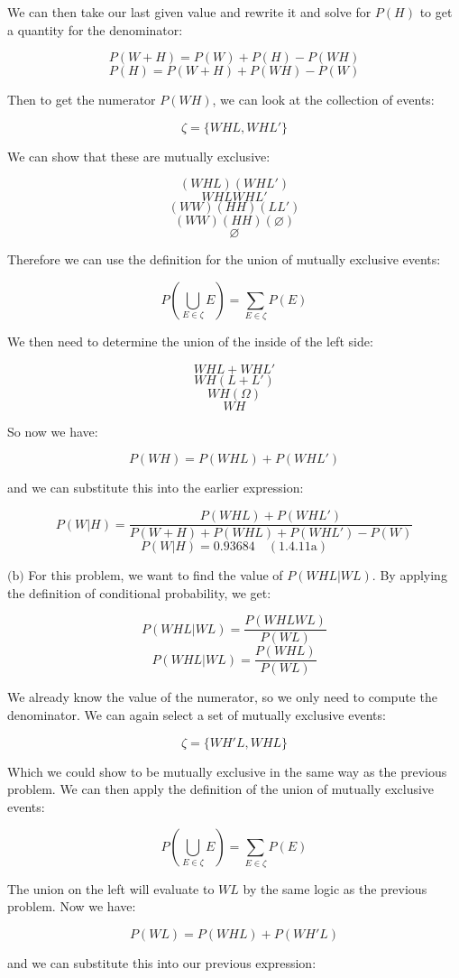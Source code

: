 \documentclass{article}
\newcommand{\subproblem}[3]{$\boxed{\text{(#3)}}$}
\newcommand{\subsolution}[4]{\boxed{#4\quad(\text{#1.#2#3})}}
\begin{document}
We can then take our last given value and rewrite it and solve for
$P(H)$ to get a quantity for the denominator:

\[
P(W+H)=P(W)+P(H)-P(WH)
\] \[
P(H)=P(W+H)+P(WH)-P(W)
\]

Then to get the numerator $P(WH)$, we can look at the collection of
events:

\[
\zeta=\{WHL, WHL'\}
\]

We can show that these are mutually exclusive:

\[
(WHL)(WHL')
\] \[
WHLWHL'
\] \[
(WW)(HH)(LL')
\] \[
(WW)(HH)(\varnothing)
\] \[
\varnothing
\]

Therefore we can use the definition for the union of mutually
exclusive events:

\[
P\left(\bigcup\limits_{E\in\zeta}E\right)=\sum\limits_{E\in\zeta}P(E)
\]

We then need to determine the union of the inside of the left side:

\[
WHL+WHL'
\] \[
WH(L+L')
\] \[
WH(\Omega)
\] \[
WH
\]

So now we have:

\[
P(WH)=P(WHL)+P(WHL')
\]

and we can substitute this into the earlier expression:

\[
P(W|H)=\dfrac{P(WHL)+P(WHL')}{P(W+H)+P(WHL)+P(WHL')-P(W)}
\] \[
\subsolution{1.4}{11}{a}{P(W|H)=0.93684}
\]

%
\subproblem{1.4}{11}{b} For this problem, we want to find the value of
$P(WHL|WL)$. By applying the definition of conditional probability, we
get:

\[
P(WHL|WL)=\dfrac{P(WHLWL)}{P(WL)}
\] \[
P(WHL|WL)=\dfrac{P(WHL)}{P(WL)}
\]

We already know the value of the numerator, so we only need to compute
the denominator. We can again select a set of mutually exclusive
events:

\[
\zeta=\{WH'L, WHL\}
\]

Which we could show to be mutually exclusive in the same way as the
previous problem. We can then apply the definition of the union of
mutually exclusive events:

\[
P\left(\bigcup\limits_{E\in\zeta}E\right)=\sum\limits_{E\in\zeta}P(E)
\]

The union on the left will evaluate to $WL$ by the same logic as the
previous problem. Now we have:

\[
P(WL)=P(WHL)+P(WH'L)
\]

and we can substitute this into our previous expression:
\end{document}
